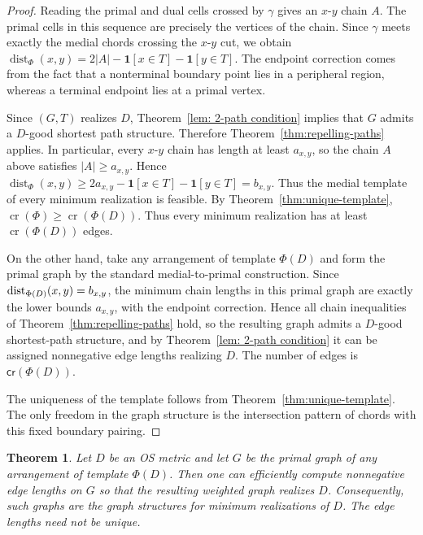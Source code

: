 \documentclass[11pt]{article}
\newtheorem{theorem}{Theorem}
\newcommand{\dist}{\textnormal{dist}}
\newcommand{\cro}{{\mathsf{cr}}}
\begin{document}
\begin{proof}
Reading the primal and dual cells crossed by $\gamma$ gives an
$x$-$y$ chain $A$.  The primal cells in this sequence are precisely the
vertices of the chain.  Since $\gamma$ meets exactly the medial chords
crossing the $x$-$y$ cut, we obtain
$\operatorname{dist}_{\Phi}(x,y)=
    2|A|-\mathbf 1[x\in T]-\mathbf 1[y\in T]$.
The endpoint correction comes from the fact that a nonterminal boundary
point lies in a peripheral region, whereas a terminal endpoint lies at a
primal vertex.

Since $(G,T)$ realizes $D$, Theorem~\ref{lem: 2-path condition} implies that $G$ admits a
$D$-good shortest path structure.  Therefore Theorem~\ref{thm:repelling-paths} applies.  In
particular, every $x$-$y$ chain has length at least $a_{x,y}$, so the
chain $A$ above satisfies $|A|\ge a_{x,y}$.  Hence
$\operatorname{dist}_{\Phi}(x,y)
    \ge
    2a_{x,y}-\mathbf 1[x\in T]-\mathbf 1[y\in T]
    =
    b_{x,y}$.
Thus the medial template of every minimum realization is feasible.
By Theorem~\ref{thm:unique-template},
$\operatorname{cr}(\Phi)\ge \operatorname{cr}(\Phi(D)).
$
Thus every minimum realization has at least
$\operatorname{cr}(\Phi(D))$ edges.

On the other hand, take any arrangement of template $\Phi(D)$ and form the primal graph by the standard medial-to-primal construction. 
Since $\dist_{\Phi(D)}(x,y)=b_{x,y}$, the minimum chain lengths in this primal graph are exactly the lower bounds $a_{x,y}$, with the endpoint correction.  Hence all chain inequalities of Theorem~\ref{thm:repelling-paths} hold, so the resulting graph admits a $D$-good shortest-path structure, and by Theorem~\ref{lem: 2-path condition} it can be assigned nonnegative edge lengths realizing $D$. The number of edges is $\cro(\Phi(D))$.

The uniqueness of the template follows from Theorem~\ref{thm:unique-template}.  The only freedom in the graph structure is the intersection pattern of chords with this fixed boundary pairing.
\end{proof}

\begin{theorem}
Let $D$ be an OS metric and let $G$ be the primal graph of any arrangement
of template $\Phi(D)$. Then one can efficiently compute
nonnegative edge lengths on $G$ so that the resulting weighted graph
realizes $D$. Consequently, such graphs are the graph structures for minimum realizations of
$D$. The edge lengths need not be unique.
\end{theorem}
\end{document}
